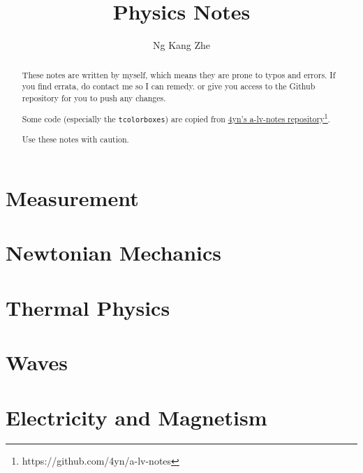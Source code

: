 \documentclass[a4paper,10pt]{article}
\title{Physics Notes}
\author{Ng Kang Zhe}
\begin{document}
\maketitle

\begin{abstract}
	These notes are written by myself, which means they are prone to typos and errors. If you find errata, do contact me so I can remedy. or give you access to the Github repository for you to push any changes.
	
	Some code (especially the \texttt{tcolorboxes}) are copied fron \href{https://github.com/4yn/a-lv-notes}{\color{blue} \underline{4yn's a-lv-notes repository\footnote{https://github.com/4yn/a-lv-notes}}}.
	
	Use these notes with caution.
\end{abstract}

\begin{multicols}{2}
\tableofcontents
\end{multicols}

\newpage
\begin{multicols*}{2}
\part{Measurement}


\part{Newtonian Mechanics}







\part{Thermal Physics}





\part{Waves}





\part{Electricity and Magnetism}



\end{multicols*}
\end{document}
